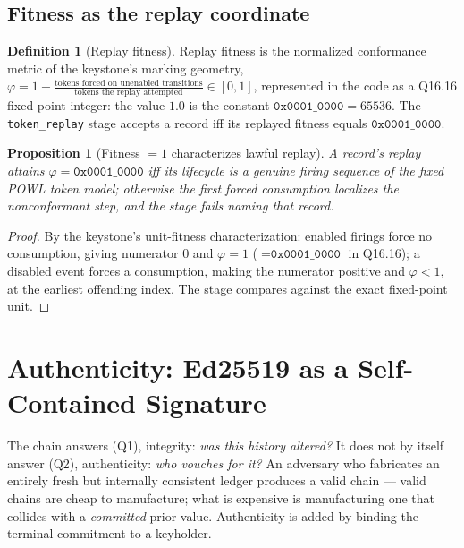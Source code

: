 \documentclass[11pt,oneside]{book}
\theoremstyle{definition}
\newtheorem{definition}{Definition}[chapter]
\theoremstyle{plain}
\newtheorem{proposition}[theorem]{Proposition}
\theoremstyle{remark}
\newcommand{\Fitness}{\varphi}
\newcommand{\code}[1]{\texttt{#1}}
\begin{document}
\section{Fitness as the replay coordinate}
\label{sec:fitness}

\begin{definition}[Replay fitness]\label{def:fitness}
Replay fitness is the normalized conformance metric of the keystone's marking geometry,
$\Fitness=1-\frac{\text{tokens forced on unenabled transitions}}{\text{tokens the replay
attempted}}\in[0,1]$, represented in the code as a Q16.16 fixed-point integer: the value $1.0$
is the constant $\code{0x0001\_0000}=65536$. %
The \code{token\_replay} stage accepts a record
iff its replayed fitness equals $\code{0x0001\_0000}$. %
\end{definition}

\begin{proposition}[Fitness $=1$ characterizes lawful replay]\label{prop:fitness}
A record's replay attains $\Fitness=\code{0x0001\_0000}$ iff its lifecycle is a genuine firing
sequence of the fixed POWL token model; otherwise the first forced consumption localizes the
nonconformant step, and the stage fails naming that record. %
\end{proposition}

\begin{proof}
By the keystone's unit-fitness characterization: enabled firings force no consumption, giving
numerator $0$ and $\Fitness=1$ ($=\code{0x0001\_0000}$ in Q16.16); a disabled event forces a
consumption, making the numerator positive and $\Fitness<1$, at the earliest offending index. %
The stage compares against the exact fixed-point unit. %
 \end{proof}

\chapter{Authenticity: Ed25519 as a Self-Contained Signature}
\label{ch:auth}

The chain answers (Q1), integrity: \emph{was this history altered?} It does not by itself
answer (Q2), authenticity: \emph{who vouches for it?} An adversary who fabricates an entirely
fresh but internally consistent ledger produces a valid chain --- valid chains are cheap to
manufacture; what is expensive is manufacturing one that collides with a \emph{committed}
prior value. %
Authenticity is added by binding the terminal commitment to a keyholder. %
\end{document}
